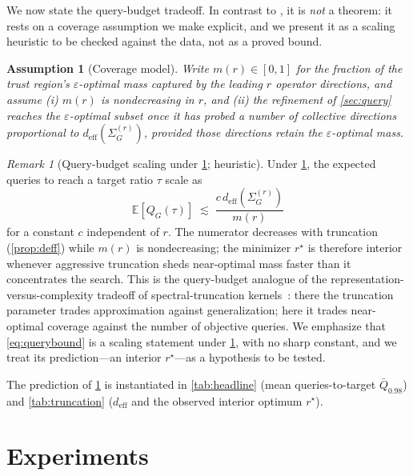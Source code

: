 \documentclass[aps,prresearch,reprint,amsmath,amssymb,floatfix,nofootinbib,superscriptaddress,longbibliography]{revtex4-2}
\newtheorem{assumption}{Assumption}
\theoremstyle{remark}
\newtheorem{remark}{Remark}
\begin{document}
We now state the query-budget tradeoff.  In contrast to
, it is \emph{not} a theorem: it rests on a coverage
assumption we make explicit, and we present it as a scaling heuristic to be
checked against the data, not as a proved bound.

\begin{assumption}[Coverage model]
\label{ass:coverage}
Write \(m(r)\in[0,1]\) for the fraction of the trust region's
\(\varepsilon\)-optimal mass captured by the leading \(r\) operator directions,
and assume (i) \(m(r)\) is nondecreasing in \(r\), and (ii) the refinement of
\cref{sec:query} reaches the \(\varepsilon\)-optimal subset once it has probed a
number of collective directions proportional to
\(d_{\mathrm{eff}}(\Sigma_G^{(r)})\), provided those directions retain the
\(\varepsilon\)-optimal mass.
\end{assumption}

\begin{remark}[Query-budget scaling under \cref{ass:coverage}; heuristic]
\label{rem:query}
Under \cref{ass:coverage}, the expected queries to reach a target ratio \(\tau\)
scale as
\begin{equation}
\mathbb{E}\!\left[Q_G(\tau)\right]\;\lesssim\;\frac{c\,d_{\mathrm{eff}}(\Sigma_G^{(r)})}{m(r)}
\label{eq:querybound}
\end{equation}
for a constant \(c\) independent of \(r\).  The numerator decreases with
truncation (\cref{prop:deff}) while \(m(r)\) is nondecreasing; the minimizer
\(r^{\star}\) is therefore interior whenever aggressive truncation sheds
near-optimal mass faster than it concentrates the search.  This is the
query-budget analogue of the representation-versus-complexity tradeoff of
spectral-truncation kernels~\cite{hashimoto2024spectral}: there the truncation
parameter trades approximation against generalization; here it trades near-optimal
coverage against the number of objective queries.  We emphasize that
\cref{eq:querybound} is a scaling statement under \cref{ass:coverage}, with no
sharp constant, and we treat its prediction---an interior \(r^{\star}\)---as a
hypothesis to be tested.
\end{remark}

The prediction of \cref{rem:query} is instantiated in \cref{tab:headline} (mean
queries-to-target \(\bar Q_{0.98}\)) and \cref{tab:truncation}
(\(d_{\mathrm{eff}}\) and the observed interior optimum \(r^{\star}\)).

\section{Experiments}
\label{sec:experiments}
\end{document}
